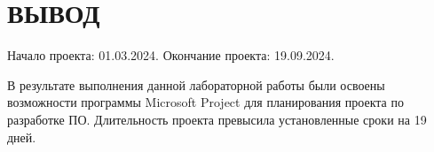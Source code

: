 \chapter*{ВЫВОД}

Начало проекта: 01.03.2024. Окончание проекта: 19.09.2024.

В результате выполнения данной лабораторной работы были освоены возможности программы Microsoft Project для планирования проекта по разработке ПО. Длительность проекта превысила установленные сроки на 19 дней.

